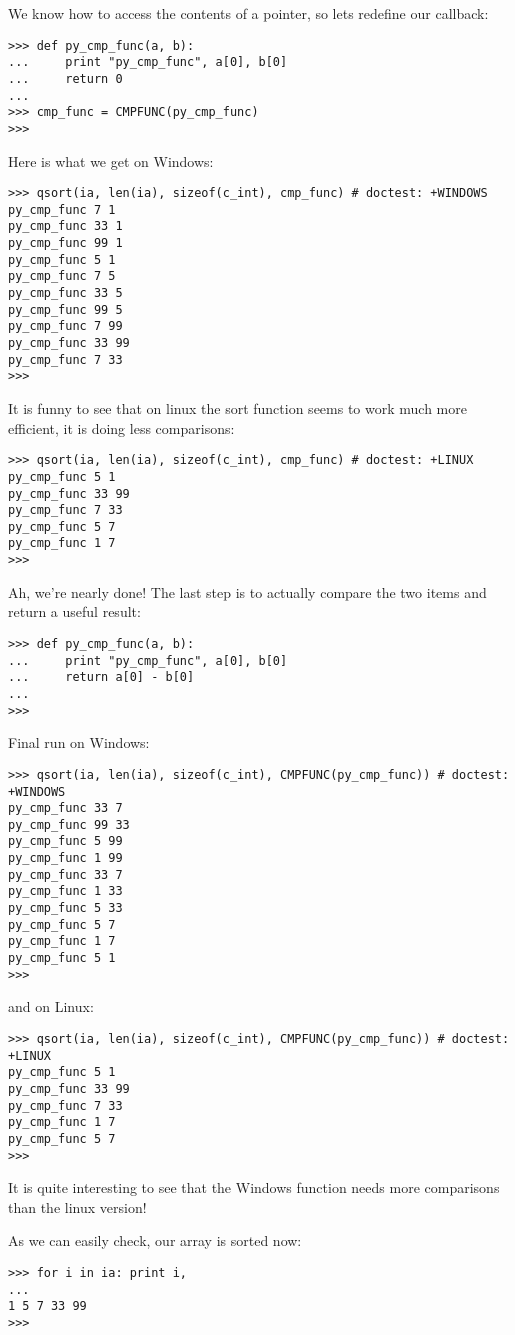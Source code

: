 We know how to access the contents of a pointer, so lets redefine our callback:
\begin{verbatim}
>>> def py_cmp_func(a, b):
...     print "py_cmp_func", a[0], b[0]
...     return 0
...
>>> cmp_func = CMPFUNC(py_cmp_func)
>>>
\end{verbatim}

Here is what we get on Windows:
\begin{verbatim}
>>> qsort(ia, len(ia), sizeof(c_int), cmp_func) # doctest: +WINDOWS
py_cmp_func 7 1
py_cmp_func 33 1
py_cmp_func 99 1
py_cmp_func 5 1
py_cmp_func 7 5
py_cmp_func 33 5
py_cmp_func 99 5
py_cmp_func 7 99
py_cmp_func 33 99
py_cmp_func 7 33
>>>
\end{verbatim}

It is funny to see that on linux the sort function seems to work much
more efficient, it is doing less comparisons:
\begin{verbatim}
>>> qsort(ia, len(ia), sizeof(c_int), cmp_func) # doctest: +LINUX
py_cmp_func 5 1
py_cmp_func 33 99
py_cmp_func 7 33
py_cmp_func 5 7
py_cmp_func 1 7
>>>
\end{verbatim}

Ah, we're nearly done! The last step is to actually compare the two
items and return a useful result:
\begin{verbatim}
>>> def py_cmp_func(a, b):
...     print "py_cmp_func", a[0], b[0]
...     return a[0] - b[0]
...
>>>
\end{verbatim}

Final run on Windows:
\begin{verbatim}
>>> qsort(ia, len(ia), sizeof(c_int), CMPFUNC(py_cmp_func)) # doctest: +WINDOWS
py_cmp_func 33 7
py_cmp_func 99 33
py_cmp_func 5 99
py_cmp_func 1 99
py_cmp_func 33 7
py_cmp_func 1 33
py_cmp_func 5 33
py_cmp_func 5 7
py_cmp_func 1 7
py_cmp_func 5 1
>>>
\end{verbatim}

and on Linux:
\begin{verbatim}
>>> qsort(ia, len(ia), sizeof(c_int), CMPFUNC(py_cmp_func)) # doctest: +LINUX
py_cmp_func 5 1
py_cmp_func 33 99
py_cmp_func 7 33
py_cmp_func 1 7
py_cmp_func 5 7
>>>
\end{verbatim}

It is quite interesting to see that the Windows  function
needs more comparisons than the linux version!

As we can easily check, our array is sorted now:
\begin{verbatim}
>>> for i in ia: print i,
...
1 5 7 33 99
>>>
\end{verbatim}


